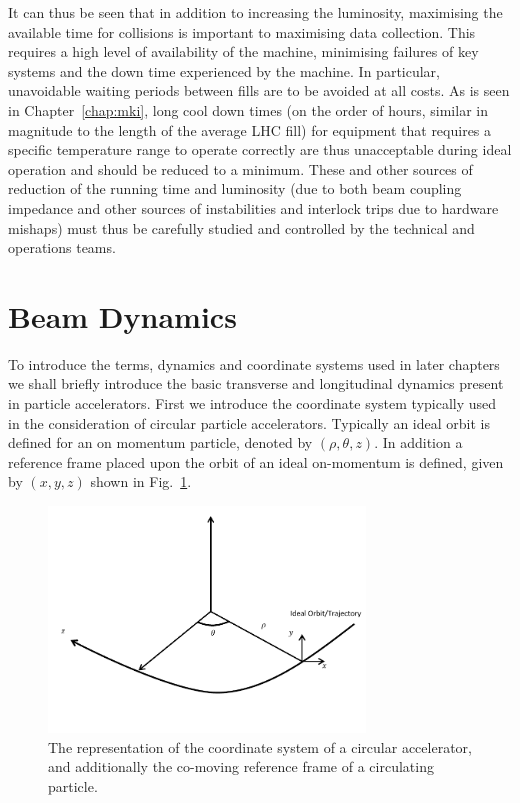 It can thus be seen that in addition to increasing the luminosity, maximising the available time for collisions is important to maximising data collection. This requires a high level of availability of the machine, minimising failures of key systems and the down time experienced by the machine. In particular, unavoidable waiting periods between fills are to be avoided at all costs. As is seen in Chapter~\ref{chap:mki}, long cool down times (on the order of hours, similar in magnitude to the length of the average LHC fill) for equipment that requires a specific temperature range to operate correctly are thus unacceptable during ideal operation and should be reduced to a minimum. These and other sources of reduction of the running time and luminosity (due to both beam coupling impedance and other sources of instabilities and interlock trips due to hardware mishaps) must thus be carefully studied and controlled by the technical and operations teams.

\section{Beam Dynamics}

To introduce the terms, dynamics and coordinate systems used in later chapters we shall briefly introduce the basic transverse and longitudinal dynamics present in particle accelerators. First we introduce the coordinate system typically used in the consideration of circular particle accelerators. Typically an ideal orbit is defined for an on momentum particle, denoted by $(\rho, \theta, z)$. In addition a reference frame placed upon the orbit of an ideal on-momentum is defined, given by $(x, y, z)$ shown in Fig.~\ref{fig:accel-coord-system}. 

\begin{figure}
\begin{center}
\includegraphics[width=0.75\textwidth]{Introduction/figures/coordinate-system.pdf}
\end{center}
\label{fig:accel-coord-system}
\caption{The representation of the coordinate system of a circular accelerator, and additionally the co-moving reference frame of a circulating particle.}
\end{figure}

